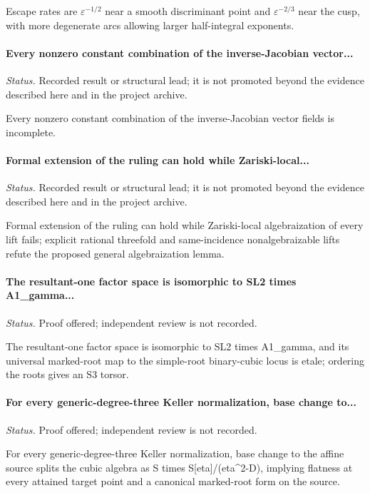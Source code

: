 Escape rates are \(\varepsilon^{-1/2}\) near a smooth discriminant point and \(\varepsilon^{-2/3}\) near the cusp, with more degenerate arcs allowing larger half-integral exponents.

\label{supp-note-01-020}
\paragraph{Every nonzero constant combination of the inverse-Jacobian vector...}
\emph{Status.} Recorded result or structural lead; it is not promoted beyond the evidence described here and in the project archive.

Every nonzero constant combination of the inverse-Jacobian vector fields is incomplete.

\label{supp-note-01-021}
\paragraph{Formal extension of the ruling can hold while Zariski-local...}
\emph{Status.} Recorded result or structural lead; it is not promoted beyond the evidence described here and in the project archive.

Formal extension of the ruling can hold while Zariski-local algebraization of every lift fails; explicit rational threefold and same-incidence nonalgebraizable lifts refute the proposed general algebraization lemma.

\label{supp-note-01-022}
\paragraph{The resultant-one factor space is isomorphic to SL2 times A1\_gamma...}
\emph{Status.} Proof offered; independent review is not recorded.

The resultant-one factor space is isomorphic to SL2 times A1\_gamma, and its universal marked-root map to the simple-root binary-cubic locus is etale; ordering the roots gives an S3 torsor.

\label{supp-note-01-023}
\paragraph{For every generic-degree-three Keller normalization, base change to...}
\emph{Status.} Proof offered; independent review is not recorded.

For every generic-degree-three Keller normalization, base change to the affine source splits the cubic algebra as S times S[eta]/(eta\textasciicircum{}2-D), implying flatness at every attained target point and a canonical marked-root form on the source.

